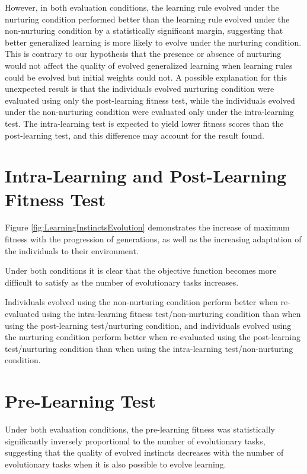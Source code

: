 \documentclass[master]{outhesis}
\begin{document}
However, in both evaluation conditions,
the learning rule evolved under the nurturing condition performed better than the learning rule evolved under the non-nurturing condition by a statistically significant margin,
suggesting that better generalized learning is more likely to evolve under the nurturing condition.
This is contrary to our hypothesis that the presence or absence of nurturing would not affect the quality of evolved generalized learning 
when learning rules could be evolved but initial weights could not.
A possible explanation for this unexpected result is that the individuals evolved nurturing condition were evaluated using only the post-learning fitness test,
while the individuals evolved under the non-nurturing condition were evaluated only under the intra-learning test.
The intra-learning test is expected to yield lower fitness scores than the post-learning test,
and this difference may account for the result found.

\section{Intra-Learning and Post-Learning Fitness Test}

Figure \ref{fig:LearningInstinctsEvolution} demonstrates the increase of maximum fitness with the progression of generations,
as well as the increasing adaptation of the individuals to their environment.

Under both conditions it is clear that the objective function becomes more difficult to satisfy as the number of evolutionary tasks increases. 

Individuals evolved using the non-nurturing condition perform better when re-evaluated using the intra-learning fitness test/non-nurturing condition than when using the post-learning test/nurturing condition,
and individuals evolved using the nurturing condition perform better when re-evaluated using the post-learning test/nurturing condition than when using the intra-learning test/non-nurturing condition.

\section{Pre-Learning Test}

Under both evaluation conditions, the pre-learning fitness was statistically significantly inversely proportional to the number of evolutionary tasks,
suggesting that the quality of evolved instincts decreases with the number of evolutionary tasks when it is also possible to evolve learning.
\end{document}
